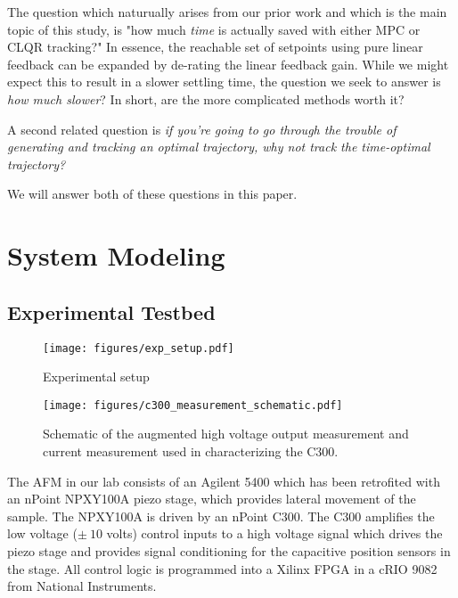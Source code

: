 \documentclass[journal,twocolumn,twoside]{IEEEtran/IEEEtran}
\begin{document}
The question which naturually arises from our prior work and which is the main topic of this study, is "how much \emph{time} is actually saved with either MPC or CLQR tracking?" In essence, the reachable set of setpoints using pure linear feedback can be expanded by de-rating the linear feedback gain. While we might expect this to result in a slower settling time, the question we seek to answer is \emph{how much slower}? In short, are the more complicated methods worth it?

A second related question is \emph{if you're going to go through the trouble of generating and tracking an optimal trajectory, why not track the time-optimal trajectory?}

We will answer both of these questions in this paper. 




\section{System Modeling}
\label{sec:orgbc45dd3}
\subsection{Experimental Testbed}
\begin{figure*}
  \begin{minipage}{0.48\textwidth}
    \texttt{[image: figures/exp\_setup.pdf]}
    \caption{Experimental setup}
    \label{fig:exp_setup}
  \end{minipage}
  \hfill
  \begin{minipage}{0.48\textwidth}
    \texttt{[image: figures/c300\_measurement\_schematic.pdf]}
    \caption{Schematic of the augmented high voltage output measurement and current measurement used in characterizing the C300.}
    \label{fig:c300_meas}
  \end{minipage}
  
\end{figure*}

The AFM in our lab consists of an Agilent 5400 which has been retrofited with an nPoint NPXY100A piezo stage, which provides lateral movement of the sample. The NPXY100A is driven by an nPoint C300. The C300 amplifies the low voltage ($\pm~10$ volts) control inputs to a high voltage signal which drives the piezo stage and provides signal conditioning for the capacitive position sensors in the stage. All control logic is programmed into a Xilinx FPGA in a cRIO 9082 from National Instruments.
\end{document}
